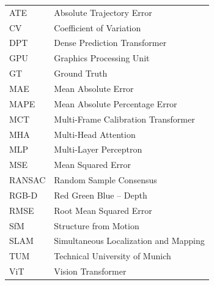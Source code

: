 \documentclass[headsepline,footsepline,footinclude=false,oneside,fontsize=11pt,paper=a4,listof=totoc,bibliography=totoc]{scrbook} %
\begin{document}


\frontmatter{}





\tableofcontents{}

\mainmatter{}










\appendix{}




\begin{tabular}{@{}ll@{}}
ATE & Absolute Trajectory Error \\
CV & Coefficient of Variation \\
DPT & Dense Prediction Transformer \\
GPU & Graphics Processing Unit \\
GT & Ground Truth \\
MAE & Mean Absolute Error \\
MAPE & Mean Absolute Percentage Error \\
MCT & Multi-Frame Calibration Transformer \\
MHA & Multi-Head Attention \\
MLP & Multi-Layer Perceptron \\
MSE & Mean Squared Error \\
RANSAC & Random Sample Consensus \\
RGB-D & Red Green Blue -- Depth \\
RMSE & Root Mean Squared Error \\
SfM & Structure from Motion \\
SLAM & Simultaneous Localization and Mapping \\
TUM & Technical University of Munich \\
ViT & Vision Transformer \\
\end{tabular}

\listoffigures{}
\listoftables{}
\printbibliography{}
\end{document}
